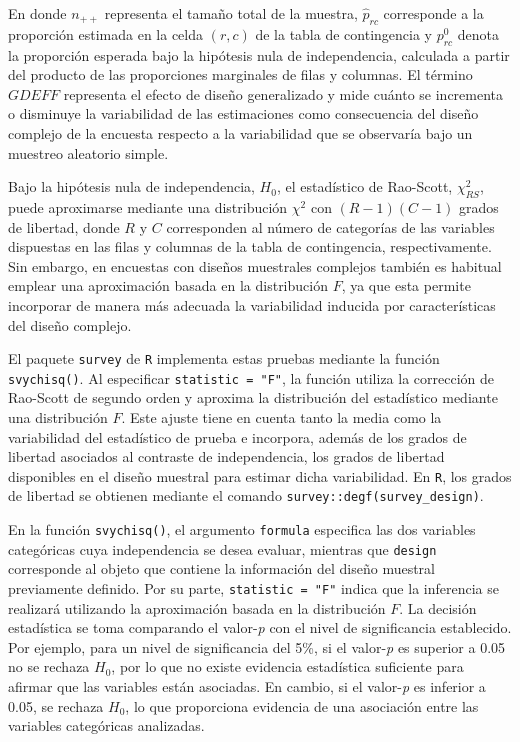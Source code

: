 \documentclass[
  spanish,
  11pt,
  letterpaper,
  oneside,
  open=any]{scrbook}
\begin{document}
En donde \(n_{++}\) representa el tamaño total de la muestra,
\(\hat{p}_{rc}\) corresponde a la proporción estimada en la celda
\((r,c)\) de la tabla de contingencia y \(p_{rc}^0\) denota la
proporción esperada bajo la hipótesis nula de independencia, calculada a
partir del producto de las proporciones marginales de filas y columnas.
El término \(GDEFF\) representa el efecto de diseño generalizado y mide
cuánto se incrementa o disminuye la variabilidad de las estimaciones
como consecuencia del diseño complejo de la encuesta respecto a la
variabilidad que se observaría bajo un muestreo aleatorio simple.

Bajo la hipótesis nula de independencia, \(H_0\), el estadístico de
Rao-Scott, \(\chi_{RS}^2\), puede aproximarse mediante una distribución
\(\chi^2\) con \((R-1)(C-1)\) grados de libertad, donde \(R\) y \(C\)
corresponden al número de categorías de las variables dispuestas en las
filas y columnas de la tabla de contingencia, respectivamente. Sin
embargo, en encuestas con diseños muestrales complejos también es
habitual emplear una aproximación basada en la distribución \(F\), ya
que esta permite incorporar de manera más adecuada la variabilidad
inducida por características del diseño complejo.

El paquete \texttt{survey} de \texttt{R} implementa estas pruebas
mediante la función \texttt{svychisq()}. Al especificar
\texttt{statistic\ =\ "F"}, la función utiliza la corrección de
Rao-Scott de segundo orden y aproxima la distribución del estadístico
mediante una distribución \(F\). Este ajuste tiene en cuenta tanto la
media como la variabilidad del estadístico de prueba e incorpora, además
de los grados de libertad asociados al contraste de independencia, los
grados de libertad disponibles en el diseño muestral para estimar dicha
variabilidad. En \texttt{R}, los grados de libertad se obtienen mediante
el comando \texttt{survey::degf(survey\_design)}.

En la función \texttt{svychisq()}, el argumento \texttt{formula}
especifica las dos variables categóricas cuya independencia se desea
evaluar, mientras que \texttt{design} corresponde al objeto que contiene
la información del diseño muestral previamente definido. Por su parte,
\texttt{statistic\ =\ "F"} indica que la inferencia se realizará
utilizando la aproximación basada en la distribución \(F\). La decisión
estadística se toma comparando el valor-\emph{p} con el nivel de
significancia establecido. Por ejemplo, para un nivel de significancia
del 5\%, si el valor-\emph{p} es superior a 0.05 no se rechaza \(H_0\),
por lo que no existe evidencia estadística suficiente para afirmar que
las variables están asociadas. En cambio, si el valor-\emph{p} es
inferior a 0.05, se rechaza \(H_0\), lo que proporciona evidencia de una
asociación entre las variables categóricas analizadas.
\end{document}
